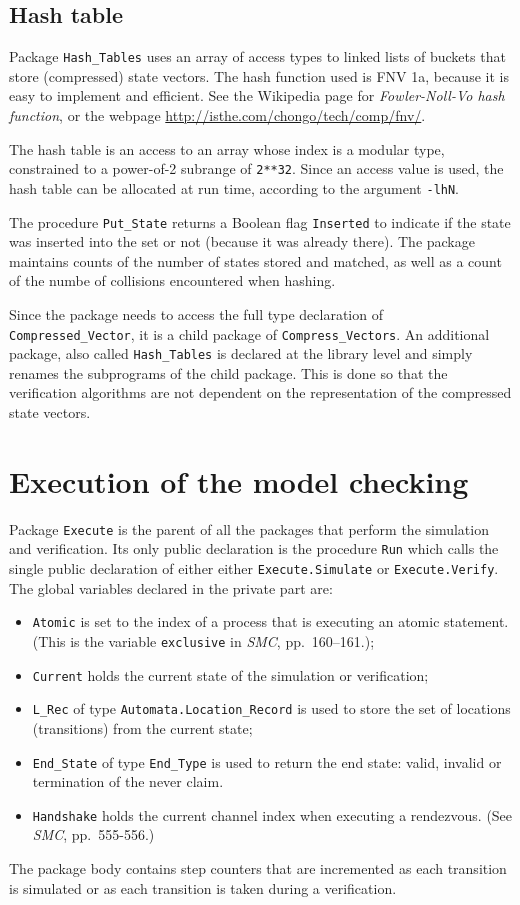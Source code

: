 \documentclass[11pt]{article}
\newcommand*{\smc}{\textit{SMC}}
\newcommand*{\p}[1]{\texttt{#1}}
\begin{document}
\subsection{Hash table}

Package \p{Hash\_Tables} uses an array of access types to linked lists
of buckets that store (compressed) state vectors. The hash function used
is FNV 1a, because it is easy to implement and efficient. See the
Wikipedia page for \emph{Fowler-Noll-Vo hash function}, or the
webpage \url{http://isthe.com/chongo/tech/comp/fnv/}.

The hash table is an access to an array whose index is a modular type,
constrained to a power-of-2 subrange of \p{2**32}. Since an access value
is used, the hash table can be allocated at run time, according to the
argument \p{-lhN}.

The procedure \p{Put\_State} returns a Boolean flag \p{Inserted} to
indicate if the state was inserted into the set or not (because it was
already there). The package maintains counts of the number of states
stored and matched, as well as a count of the numbe of collisions
encountered when hashing.

Since the package needs to access the full type declaration of
\p{Compressed\_Vector}, it is a child package of \p{Compress\_Vectors}.
An additional package, also called \p{Hash\_Tables} is declared at the
library level and simply renames the subprograms of the child package.
This is done so that the verification algorithms are not dependent on
the representation of the compressed state vectors.

\section{Execution of the model checking}

Package \p{Execute} is the parent of all the packages that perform the
simulation and verification. Its only public declaration is the
procedure \p{Run} which calls the single public declaration of either
either \p{Execute.Simulate} or \p{Execute.Verify}.
The global variables declared in the private part are:
\begin{itemize}
\item \p{Atomic} is set to the index of a process that is
executing an atomic statement. (This is the variable \p{exclusive} in
\smc{}, pp.~160--161.);
\item \p{Current} holds the current state of the simulation or
verification;
\item \p{L\_Rec} of type \p{Automata.Location\_Record} is used
to store the set of locations (transitions) from the current state;
\item \p{End\_State} of type \p{End\_Type} is used to return the end state:
valid, invalid or termination of the never claim.
\item \p{Handshake} holds the current channel index when executing a
rendezvous. (See \smc{}, pp.~555-556.)
\end{itemize}
The package body contains step counters that are incremented as each
transition is simulated or as each transition is taken during a
verification.
\end{document}
